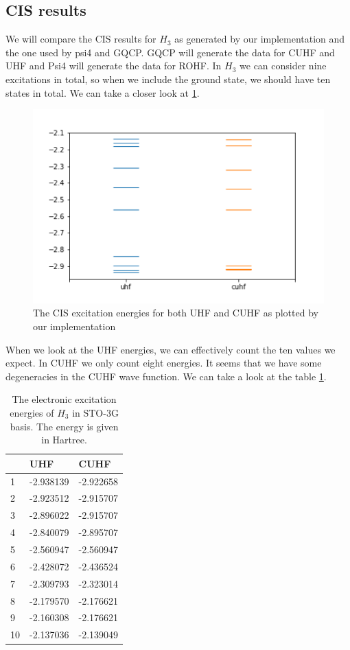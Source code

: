 \documentclass[twoside,twocolumn,9pt]{article}
\begin{document}
\subsection{CIS results}
\label{subsec:cis}
We will compare the CIS results for $H_3$ as generated by our implementation and the one used by psi4 and GQCP. GQCP will generate the data for CUHF and UHF and Psi4 will generate
the data for ROHF. In $H_3$ we can consider nine excitations in total, so when we include the ground state, we should have ten states in total. We can take a closer look at
\ref{fig:h3_cis}.
\begin{center}
  \begin{figure}[h]
    \includegraphics[width=\linewidth]{./../notes/figures/h3_cis.png}
    \caption{The CIS excitation energies for both UHF and CUHF as plotted by our implementation}
    \label{fig:h3_cis}
  \end{figure}
\end{center}
When we look at the UHF energies, we can effectively count the ten values we expect. In CUHF we only count eight energies. It seems that we have some degeneracies in the CUHF
wave function. We can take a look at the table \ref{tab:excits}.
\begin{table}[h]
  \caption{The electronic excitation energies of $H_3$ in STO-3G basis. The energy is given in Hartree.}
  \label{tab:excits}
  \begin{tabular}{l|l|l}
       & UHF       & CUHF      \\
    \hline
    1  & -2.938139 & -2.922658 \\
    2  & -2.923512 & -2.915707 \\
    3  & -2.896022 & -2.915707 \\
    4  & -2.840079 & -2.895707 \\
    5  & -2.560947 & -2.560947 \\
    6  & -2.428072 & -2.436524 \\
    7  & -2.309793 & -2.323014 \\
    8  & -2.179570 & -2.176621 \\
    9  & -2.160308 & -2.176621 \\
    10 & -2.137036 & -2.139049
  \end{tabular}
\end{table}
\end{document}
